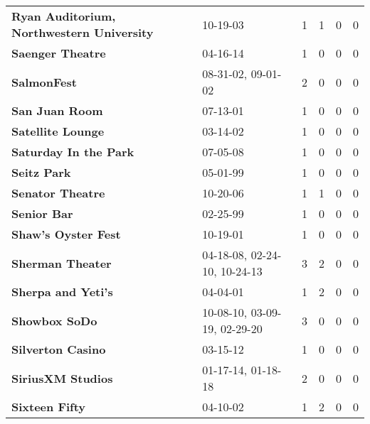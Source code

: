 \begin{supertabular}{llllll}
                    \textbf{Ryan Auditorium, Northwestern University} &                      10-19-03 &  1 &   1 &  0 &  0 \\
                                             \textbf{Saenger Theatre} &                      04-16-14 &  1 &   0 &  0 &  0 \\
                                                  \textbf{SalmonFest} &            08-31-02, 09-01-02 &  2 &   0 &  0 &  0 \\
                                               \textbf{San Juan Room} &                      07-13-01 &  1 &   0 &  0 &  0 \\
                                            \textbf{Satellite Lounge} &                      03-14-02 &  1 &   0 &  0 &  0 \\
                                        \textbf{Saturday In the Park} &                      07-05-08 &  1 &   0 &  0 &  0 \\
                                                  \textbf{Seitz Park} &                      05-01-99 &  1 &   0 &  0 &  0 \\
                                             \textbf{Senator Theatre} &                      10-20-06 &  1 &   1 &  0 &  0 \\
                                                  \textbf{Senior Bar} &                      02-25-99 &  1 &   0 &  0 &  0 \\
                                          \textbf{Shaw's Oyster Fest} &                      10-19-01 &  1 &   0 &  0 &  0 \\
                                             \textbf{Sherman Theater} &  04-18-08, 02-24-10, 10-24-13 &  3 &   2 &  0 &  0 \\
                                           \textbf{Sherpa and Yeti's} &                      04-04-01 &  1 &   2 &  0 &  0 \\
                                                \textbf{Showbox SoDo} &  10-08-10, 03-09-19, 02-29-20 &  3 &   0 &  0 &  0 \\
                                            \textbf{Silverton Casino} &                      03-15-12 &  1 &   0 &  0 &  0 \\
                                            \textbf{SiriusXM Studios} &            01-17-14, 01-18-18 &  2 &   0 &  0 &  0 \\
                                               \textbf{Sixteen Fifty} &                      04-10-02 &  1 &   2 &  0 &  0 \\

\end{supertabular}
